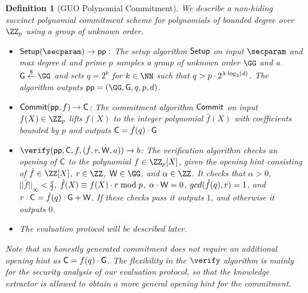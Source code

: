 \documentclass[12pt]{article}
\theoremstyle{Definition}
\newtheorem{definition}{Definition}
\newtheorem{fact}{Fact}
\begin{document}

\begin{definition}[GUO Polynomial Commitment]
We describe a non-hiding succinct polynomial commitment scheme for polynomials of bounded degree over $\ZZ_p$ using a group of unknown order.
\begin{itemize}
	\item $\setup(\secparam) \rightarrow \crs:$
The setup algorithm $\textsf{{Setup}}$ on input $\secparam$ and max degree $d$ and prime $p$ samples a group of unknown order $\GG$ and a $\Generator \sample \GG$ and sets $q=2^k$ for $k \in \NN$ such that $q>p\cdot 2^{\lambda \cdot \log_2(d)}$. The algorithm outputs $\crs=(\GG,\Generator,q,p,d)$.

\item $\textsf{{Commit}}(\textsf{pp}, f) \rightarrow \mathsf{C}$: The commitment algorithm $\textsf{{Commit}}$ on input $f(X)\in \ZZ_p$ lifts $f(X)$ to the integer polynomial $\hat{f}(X)$ with coefficients bounded by $p$ and outputs $\mathsf{C} =\hat{f}(q) \cdot \mathsf{G}$
\item $\verify(\crs, \Commitment, f, (\hat{f}, \denom,  \gr{W}, a)) \rightarrow b$: 
The verification algorithm checks an opening of $\mathsf{C}$ to the polynomial $f \in \ZZ_p[X]$, given the opening hint consisting of $\hat{f}\in \ZZ[X]$, $\denom \in \ZZ$, $\gr{W} \in \GG$, and $\alpha \in \ZZ$. It checks that $\alpha > 0$, $||\hat{f}||_\infty < \frac{q}{2}$, $\hat{f}(X) \equiv f(X)\cdot r \bmod p$, $\alpha\cdot \mathsf{W}=0$, $gcd(\hat{f}(q), r) = 1$, and $r \cdot \mathsf{C} =\hat{f}(q)\cdot \mathsf{G} +\mathsf{W}$. If these checks pass it outputs $1$, and otherwise it outputs $0$. 
\item The evaluation protocol will be described later.
\end{itemize}
Note that an honestly generated commitment does not require an additional opening hint as $\mathsf{C} = f(q) \cdot \mathsf{G}$. The flexibility in the $\verify$ algorithm is mainly for the security analysis of our evaluation protocol, so that the knowledge extractor is allowed to obtain a more general opening hint for the commitment. 
\end{definition}
\end{document}
